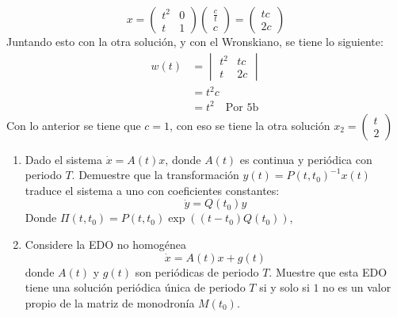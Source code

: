 \documentclass{homework}
\begin{document}
\begin{sol}
\begin{enumerate}[label=(\alph*)]
        \begin{equation*}
            x=\begin{pmatrix}
                t^2&0\\t&1
            \end{pmatrix}\begin{pmatrix}
                \frac{c}t\\c
            \end{pmatrix}=\begin{pmatrix}
                tc\\2c
            \end{pmatrix}
        \end{equation*}
        Juntando esto con la otra solución, y con el Wronskiano, se tiene lo siguiente:
        \begin{align*}
            w(t)&=\begin{vmatrix}
                t^2&tc\\t&2c
            \end{vmatrix}\\
            &=t^2c\\
            &=t^2\quad\text{Por 5b}
        \end{align*}
        Con lo anterior se tiene que \(c=1\), con eso se tiene la otra solución \(x_2=\begin{pmatrix}
            t\\2
        \end{pmatrix}\)
    \end{enumerate}
\end{sol}

\begin{prob}
    \begin{enumerate}[label=(\alph*)]
        \item Dado el sistema \(\dot{x}=A(t)x\), donde \(A(t)\) es continua y periódica con periodo \(T\). Demuestre que la transformación \(y(t)=P(t,t_0)^{-1}x(t)\) traduce el sistema a uno con coeficientes constantes:
        \[\dot{y}=Q(t_0)y\]
        Donde \(\Pi(t,t_0)=P(t,t_0)\exp((t-t_0)Q(t_0))\), 
        \item Considere la EDO no homogénea
        \[\dot{x}=A(t)x+g(t)\]
        donde \(A(t)\) y \(g(t)\) son periódicas de periodo \(T\). Muestre que esta EDO tiene una solución periódica única de periodo \(T\) si y solo si \(1\) no es un valor propio de la matriz de monodronía \(M(t_0)\).
    \end{enumerate}
\end{prob}
\end{document}
